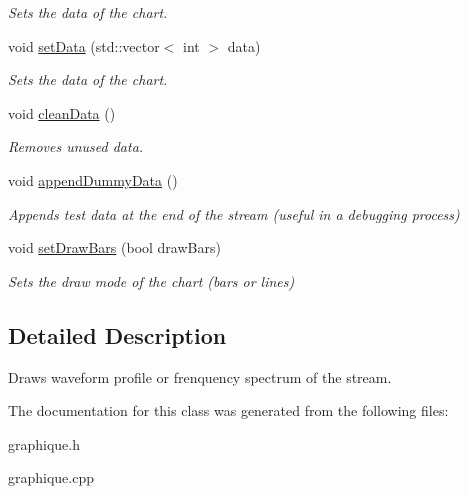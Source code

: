 \begin{DoxyCompactItemize}
\begin{DoxyCompactList}\small\item\em Sets the data of the chart. \item\end{DoxyCompactList}\item 
\hypertarget{classGraphique_ad9ceec8729e3ce60d6f058099e3bcb45}{
void \hyperlink{classGraphique_ad9ceec8729e3ce60d6f058099e3bcb45}{setData} (std::vector$<$ int $>$ data)}
\label{classGraphique_ad9ceec8729e3ce60d6f058099e3bcb45}

\begin{DoxyCompactList}\small\item\em Sets the data of the chart. \item\end{DoxyCompactList}\item 
\hypertarget{classGraphique_adf5da066d0cc022f05b83fd335008b9e}{
void \hyperlink{classGraphique_adf5da066d0cc022f05b83fd335008b9e}{cleanData} ()}
\label{classGraphique_adf5da066d0cc022f05b83fd335008b9e}

\begin{DoxyCompactList}\small\item\em Removes unused data. \item\end{DoxyCompactList}\item 
\hypertarget{classGraphique_a6965ada72555d4216241617827ff51af}{
void \hyperlink{classGraphique_a6965ada72555d4216241617827ff51af}{appendDummyData} ()}
\label{classGraphique_a6965ada72555d4216241617827ff51af}

\begin{DoxyCompactList}\small\item\em Appends test data at the end of the stream (useful in a debugging process) \item\end{DoxyCompactList}\item 
\hypertarget{classGraphique_aea11327c2f1454153180ecbfc7637920}{
void \hyperlink{classGraphique_aea11327c2f1454153180ecbfc7637920}{setDrawBars} (bool drawBars)}
\label{classGraphique_aea11327c2f1454153180ecbfc7637920}

\begin{DoxyCompactList}\small\item\em Sets the draw mode of the chart (bars or lines) \item\end{DoxyCompactList}\end{DoxyCompactItemize}


\subsection{Detailed Description}
Draws waveform profile or frenquency spectrum of the stream. 

The documentation for this class was generated from the following files:\begin{DoxyCompactItemize}
\item 
graphique.h\item 
graphique.cpp\end{DoxyCompactItemize}
